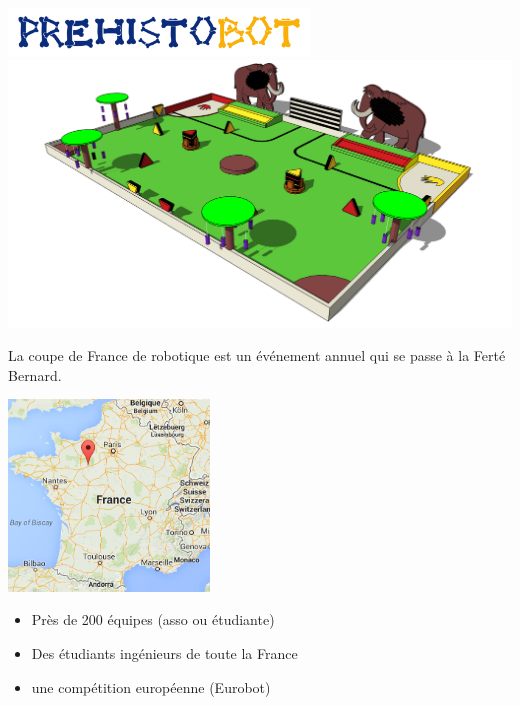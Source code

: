 \begin{frame}
   \begin{center}
      \includegraphics[width=0.6\textwidth]{../images/prehistobot.png}\\
      \includegraphics[width=\textwidth]{../images/table.png}
   \end{center}
\end{frame}

\begin{frame}
   La coupe de France de robotique est un événement annuel qui se passe à la Ferté Bernard.
   \begin{center}
      \includegraphics[width=0.4\textwidth]{../images/ferte.png}
   \end{center}
\end{frame}

\begin{frame}
   \begin{itemize}
      \item Près de 200 équipes (asso ou étudiante)
      \item Des étudiants ingénieurs de toute la France
      \item une compétition européenne (Eurobot)
   \end{itemize}
\end{frame}

